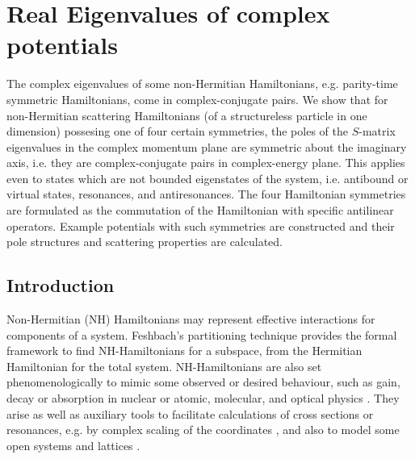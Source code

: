 
\chapter{Real Eigenvalues of complex potentials}
\label{ChapterRealEigenValues}
%
The complex eigenvalues of some non-Hermitian Hamiltonians, e.g. parity-time symmetric Hamiltonians, come in complex-conjugate pairs. We show that for non-Hermitian scattering Hamiltonians (of a structureless particle in one dimension) possesing one of four certain symmetries, the poles of the $S$-matrix eigenvalues in the complex  momentum plane are symmetric about the imaginary axis, i.e. they  are complex-conjugate pairs in complex-energy plane. This applies even to states which are not bounded eigenstates of the system, i.e. antibound or virtual states, resonances, and antiresonances. The four Hamiltonian symmetries are formulated as the commutation of the Hamiltonian with specific antilinear operators. Example potentials with such symmetries are constructed and their pole structures and scattering properties are calculated.
%
\newpage
%
%
\section{Introduction}
%
%
%
%
Non-Hermitian (NH) Hamiltonians may represent effective interactions for components of a system. Feshbach's partitioning technique \cite{Feshbach1958,Feshbach1962} provides the formal framework to find NH-Hamiltonians for a subspace, from the Hermitian Hamiltonian for the total system. NH-Hamiltonians are also set phenomenologically to mimic some observed or desired behaviour, such as gain, decay or absorption in nuclear or atomic, molecular, and optical physics \cite{Muga2004,Feng2017,El-Ganainy2018,Moiseyev2011,Longhi2017a,Konotop2016}. They arise as well as auxiliary tools to facilitate calculations of cross sections  or resonances, e.g. by complex scaling of the coordinates \cite{Aguilar1971,Balslev1971}, and also to model some open systems \cite{Rotter2019} and lattices \cite{Alvarez2018}.

